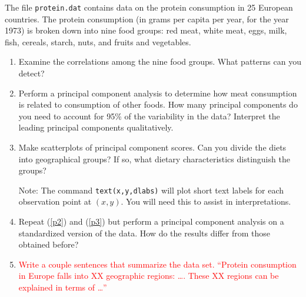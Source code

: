 \documentclass[11pt,titlepage,fleqn]{article}
\begin{document}
The file \verb+protein.dat+ contains data on the protein consumption in 25 European countries. The protein consumption (in grams per capita per year, for the year 1973) is broken down into nine food groups: red meat, white meat, eggs, milk, fish, cereals, starch, nuts, and fruits and vegetables.
%
\begin{enumerate}
\item Examine the correlations among the nine food groups. What patterns can you detect?

\label{p1}

\item Perform a principal component analysis to determine how meat consumption is related to consumption of other foods. How many principal components do you need to account for 95\% of the variability in the data? Interpret the leading principal components qualitatively.

\label{p2}

\item Make scatterplots of principal component scores. Can you divide the diets into geographical groups? If so, what dietary characteristics distinguish the groups?

Note: The command \verb+text(x,y,dlabs)+ will plot short text labels for each observation point at $(x,y)$. You will need this to assist in interpretations.

\label{p3}

\item Repeat (\ref{p2}) and (\ref{p3}) but perform a principal component analysis on a standardized version of the data. How do the results differ from those obtained before?

\item \textcolor{red}{Write a couple sentences that summarize the data set. ``Protein consumption in Europe falls into XX geographic regions: \ldots. These XX regions can be explained in terms of \ldots''}

\end{enumerate}

%
%

\end{document}
